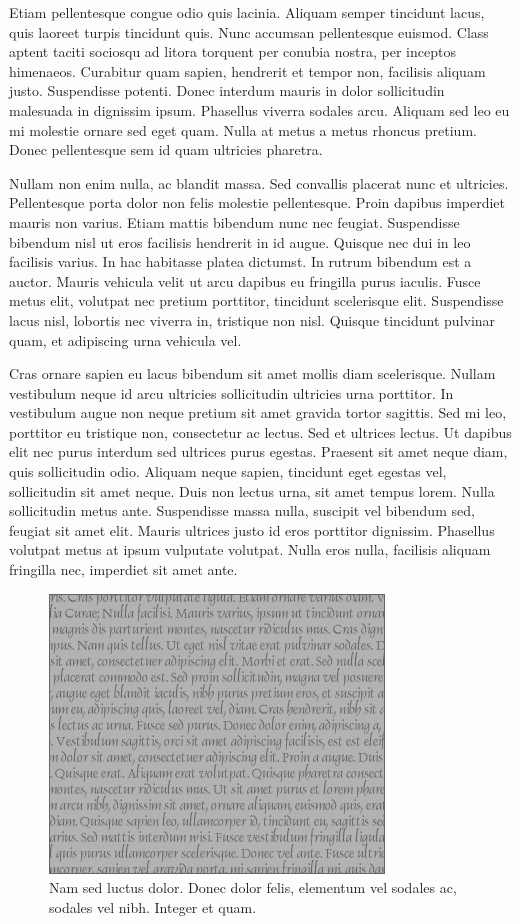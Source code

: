Etiam pellentesque congue odio quis lacinia.
Aliquam semper tincidunt lacus, quis laoreet turpis tincidunt quis.
Nunc accumsan pellentesque euismod.
Class aptent taciti sociosqu ad litora torquent per conubia nostra, per inceptos himenaeos.
Curabitur quam sapien, hendrerit et tempor non, facilisis aliquam justo.
Suspendisse potenti.
Donec interdum mauris in dolor sollicitudin malesuada in dignissim ipsum.
Phasellus viverra sodales arcu.
Aliquam sed leo eu mi molestie ornare sed eget quam.
Nulla at metus a metus rhoncus pretium.
Donec pellentesque sem id quam ultricies pharetra.

Nullam non enim nulla, ac blandit massa.
Sed convallis placerat nunc et ultricies.
Pellentesque porta dolor non felis molestie pellentesque.
Proin dapibus imperdiet mauris non varius.
Etiam mattis bibendum nunc nec feugiat.
Suspendisse bibendum nisl ut eros facilisis hendrerit in id augue.
Quisque nec dui in leo facilisis varius.
In hac habitasse platea dictumst.
In rutrum bibendum est a auctor.
Mauris vehicula velit ut arcu dapibus eu fringilla purus iaculis.
Fusce metus elit, volutpat nec pretium porttitor, tincidunt scelerisque elit.
Suspendisse lacus nisl, lobortis nec viverra in, tristique non nisl.
Quisque tincidunt pulvinar quam, et adipiscing urna vehicula vel.

Cras ornare sapien eu lacus bibendum sit amet mollis diam scelerisque.
Nullam vestibulum neque id arcu ultricies sollicitudin ultricies urna porttitor.
In vestibulum augue non neque pretium sit amet gravida tortor sagittis.
Sed mi leo, porttitor eu tristique non, consectetur ac lectus.
Sed et ultrices lectus.
Ut dapibus elit nec purus interdum sed ultrices purus egestas.
Praesent sit amet neque diam, quis sollicitudin odio.
Aliquam neque sapien, tincidunt eget egestas vel, sollicitudin sit amet neque.
Duis non lectus urna, sit amet tempus lorem.
Nulla sollicitudin metus ante.
Suspendisse massa nulla, suscipit vel bibendum sed, feugiat sit amet elit.
Mauris ultrices justo id eros porttitor dignissim.
Phasellus volutpat metus at ipsum vulputate volutpat.
Nulla eros nulla, facilisis aliquam fringilla nec, imperdiet sit amet ante.

\begin{figure}[t]
  \centering
  \includegraphics{figs/large-rectangle-gray}
  \caption[Nam sed luctus dolor]{
    Nam sed luctus dolor.
Donec dolor felis, elementum vel sodales ac, sodales vel nibh.
Integer et quam.
  }
\end{figure}

